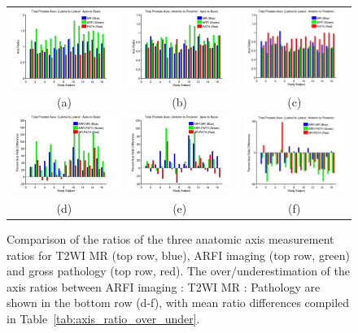 \begin{figure}
\centering
\begin{tabular}{ccc}
\includegraphics[width=0.3\linewidth]{figs/mr_arfi_total_axes1} &
\includegraphics[width=0.3\linewidth]{figs/mr_arfi_total_axes2} &
\includegraphics[width=0.3\linewidth]{figs/mr_arfi_total_axes3} \\
(a) & (b) & (c) \\
\includegraphics[width=0.3\linewidth]{figs/mr_arfi_total_over_under1} &
\includegraphics[width=0.3\linewidth]{figs/mr_arfi_total_over_under2} &
\includegraphics[width=0.3\linewidth]{figs/mr_arfi_total_over_under3} \\
(d) & (e) & (f) \\
\end{tabular}
\caption{Comparison of the ratios of the three anatomic axis measurement ratios
    for T2WI MR (top row, blue), ARFI imaging (top row, green) and gross
    pathology (top row, red).  The over/underestimation of the axis ratios
    between ARFI imaging : T2WI MR : Pathology are shown in the bottom row
    (d-f), with mean ratio differences compiled in
    Table~\ref{tab:axis_ratio_over_under}.}
\label{fig:mr_arfi_total_axes} 
\end{figure}
